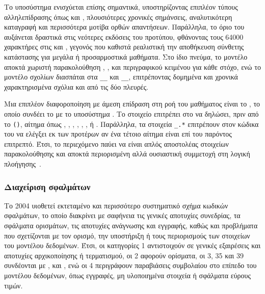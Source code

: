 Το υποσύστημα  ενισχύεται επίσης σημαντικά, υποστηρίζοντας επιπλέον τύπους αλληλεπίδρασης όπως  και , πλουσιότερες χρονικές σημάνσεις, αναλυτικότερη καταγραφή  και περισσότερα μοτίβα ορθών απαντήσεων. Παράλληλα, το όριο του  αυξάνεται δραστικά στις νεότερες εκδόσεις του προτύπου, φθάνοντας τους 64000 χαρακτήρες στις  και , γεγονός που καθιστά ρεαλιστική την αποθήκευση σύνθετης κατάστασης για μεγάλα ή προσαρμοστικά μαθήματα. Στο ίδιο πνεύμα, το μοντέλο  αποκτά χωριστή παρακολούθηση , ,  και περιγραφικού κειμένου για κάθε στόχο, ενώ το μοντέλο σχολίων διασπάται στα \texttt{\_\_} και \texttt{\_\_}, επιτρέποντας δομημένα και χρονικά χαρακτηρισμένα σχόλια και από τις δύο πλευρές.

Μια επιπλέον διαφοροποίηση με άμεση επίδραση στη ροή του μαθήματος είναι το  , το οποίο συνδέει το  με το υποσύστημα . Το στοιχείο \texttt{} επιτρέπει στο  να δηλώσει, πριν από το \texttt{()}, αίτημα όπως , , , , , ,  ή . Παράλληλα, τα στοιχεία \texttt{\_.*} επιτρέπουν στον κώδικα του  να ελέγξει εκ των προτέρων αν ένα τέτοιο αίτημα είναι επί του παρόντος επιτρεπτό. Έτσι, το περιεχόμενο παύει να είναι απλός αποστολέας στοιχείων παρακολούθησης και αποκτά περιορισμένη αλλά ουσιαστική συμμετοχή στη λογική πλοήγησης~\cite{ADL_SCORM2004_SN, IMS_SS_BehaviorModel}.

\subsubsection{Διαχείριση σφαλμάτων}

Το  2004 υιοθετεί εκτεταμένο και περισσότερο συστηματικό σχήμα κωδικών σφαλμάτων, το οποίο διακρίνει με σαφήνεια τις γενικές αποτυχίες συνεδρίας, τα σφάλματα ορισμάτων, τις αποτυχίες ανάγνωσης και εγγραφής, καθώς και προβλήματα που σχετίζονται με τον ορισμό, την υποστήριξη ή τους περιορισμούς των στοιχείων του μοντέλου δεδομένων. Έτσι, οι κατηγορίες 1 αντιστοιχούν σε γενικές εξαιρέσεις και αποτυχίες αρχικοποίησης ή τερματισμού, οι 2 αφορούν ορίσματα, οι 3, 35 και 39 συνδέονται με ,  και , ενώ οι 4 περιγράφουν παραβιάσεις συμβολαίου στο επίπεδο του μοντέλου δεδομένων, όπως  εγγραφές, μη υλοποιημένα στοιχεία ή σφάλματα εύρους τιμών.

